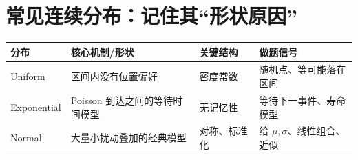 \documentclass[11pt,a4paper,openany]{ctexbook}
\begin{document}
\section{常见连续分布：记住其“形状原因”}
\begin{longtable}{L{2.8cm}L{4.7cm}L{4.2cm}L{\dimexpr\linewidth-12.67cm\relax}}
\toprule
\textbf{分布} & \textbf{核心机制/形状} & \textbf{关键结构} & \textbf{做题信号}\\
\midrule
Uniform & 区间内没有位置偏好 & 密度常数 & 随机点、等可能落在区间\\
Exponential & Poisson 到达之间的等待时间模型 & 无记忆性 & 等待下一事件、寿命模型\\
Normal & 大量小扰动叠加的经典模型 & 对称、标准化 & 给 $\mu,\sigma$、线性组合、近似\\
\bottomrule
\end{longtable}
\end{document}
